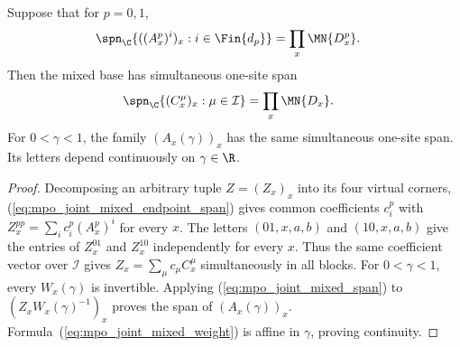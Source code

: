 \begin{lemma}
    \label{thm:mpo_joint_mixed_span}
    \leanok
    Suppose that for $p=0,1$,
    \begin{align}
        \spn_{\C}\{((A_x^p)^i)_x:i\in\Fin{d_p}\}
         & =\prod_x\MN{D_x^p}.
        \label{eq:mpo_joint_mixed_endpoint_span}
    \end{align}
    Then the mixed base has simultaneous one-site span
    \begin{align}
        \spn_{\C}\{(C_x^\mu)_x:\mu\in\mathcal I\}
         & =\prod_x\MN{D_x}.
        \label{eq:mpo_joint_mixed_span}
    \end{align}
    For $0<\gamma<1$, the family $(A_x(\gamma))_x$ has the same
    simultaneous one-site span. Its letters depend continuously on
    $\gamma\in\R$.
\end{lemma}
\begin{proof}
    \leanok
    Decomposing an arbitrary tuple $Z=(Z_x)_x$ into its four virtual
    corners, (\ref{eq:mpo_joint_mixed_endpoint_span}) gives common
    coefficients $c_i^p$ with
    $Z_x^{pp}=\sum_i c_i^p(A_x^p)^i$ for every $x$.
    The letters $(01,x,a,b)$ and $(10,x,a,b)$ give the entries of
    $Z_x^{01}$ and $Z_x^{10}$ independently for every $x$.
    Thus the same coefficient vector over $\mathcal I$ gives
    $Z_x=\sum_\mu c_\mu C_x^\mu$ simultaneously in all blocks.
    For $0<\gamma<1$, every $W_x(\gamma)$ is invertible. Applying
    (\ref{eq:mpo_joint_mixed_span}) to
    $(Z_xW_x(\gamma)^{-1})_x$ proves the span of $(A_x(\gamma))_x$.
    Formula~(\ref{eq:mpo_joint_mixed_weight}) is affine in $\gamma$,
    proving continuity.
\end{proof}

